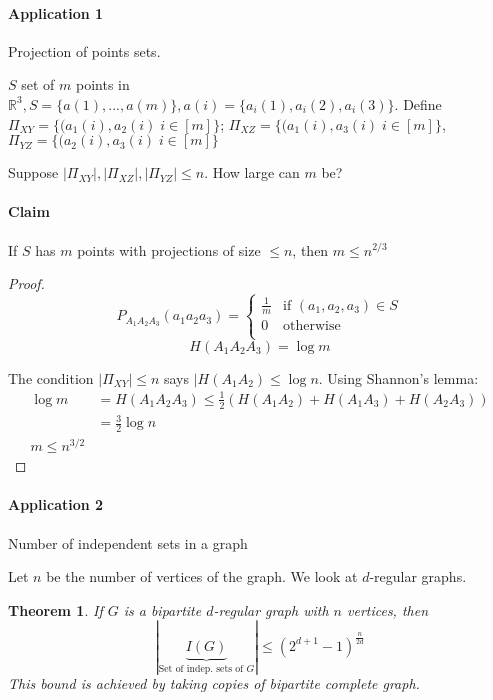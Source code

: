 \documentclass{article}
\newtheorem{thm}{Theorem}
\begin{document}
\paragraph{Application 1} Projection of points sets.

$S$ set of $m$ points in $\mathbb{R}^3, S=\{a(1),...,a(m)\}, a(i)=\{a_i(1),a_i(2),a_i(3)\}$.
Define \\ $\Pi_{XY}=\{(a_1(i),a_2(i)\; i\in [m]\}$; $\Pi_{XZ}=\{(a_1(i),a_3(i)\; i\in [m]\}$, $\Pi_{YZ}=\{(a_2(i),a_3(i)\; i\in [m]\}$

Suppose $|\Pi_{XY}|,|\Pi_{XZ}|,|\Pi_{YZ}|\leq n$. How large can $m$ be?

\paragraph{Claim} If $S$ has $m$ points with projections of size $\leq n$, then $m\leq n^{2/3}$

\begin{proof}
\[P_{A_1A_2A_3}(a_1a_2a_3)=
\begin{cases}
\frac{1}{m} & \text{if } (a_1,a_2,a_3)\in S\\
0 & \text{otherwise}\\
\end{cases}\]
\[H(A_1A_2A_3)=\log m\]

The condition $|\Pi_{XY}|\leq n$ says $|H(A_1A_2)\leq \log n$. Using Shannon's lemma:
\begin{align*}
\log m & = H(A_1A_2A_3)\leq \frac{1}{2}(H(A_1A_2)+H(A_1A_3)+H(A_2A_3))\\
& = \frac{3}{2}\log n\\
m\leq n^{3/2}
\end{align*}
\end{proof}

\paragraph{Application 2} Number of independent sets in a graph

Let $n$ be the number of vertices of the graph. We look at $d$-regular graphs.

\begin{thm}
If $G$ is a bipartite $d$-regular graph with $n$ vertices, then
\[|\underbrace{I(G)}_{\text{Set of indep. sets of }G}|\leq (2^{d+1}-1)^{\frac{n}{2d}}\]
This bound is achieved by taking copies of bipartite complete graph.
\end{thm}
\end{document}
